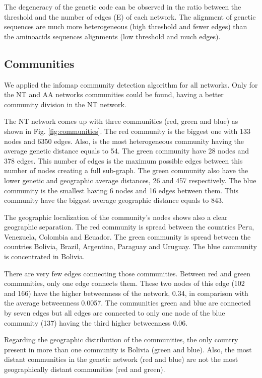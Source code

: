 \documentclass[10pt,letterpaper]{article}
\begin{document}
The degeneracy of the genetic code can be observed in the ratio between the threshold and the number of edges (E) of each network. The alignment of genetic sequences are much more heterogeneous (high threshold and fewer edges) than the aminoacids sequences alignments (low threshold and much edges). 


\subsection*{Communities} We applied the infomap community detection algorithm for all networks. Only for the NT and AA networks communities could be found, having a better community division in the NT network.

The NT network comes up with three communities (red, green and blue) as shown in Fig. \ref{fig:communities}. The red community is the biggest one with 133 nodes and 6350 edges. Also, is the most heterogeneous community having the average genetic distance equals to 54. The green community have 28 nodes and 378 edges. This number of edges is the maximum possible edges between this number of nodes creating a full sub-graph. The green community also have the lower genetic and geographic average distances, 26 and 457 respectively. The blue community is the smallest having 6 nodes and 16 edges between them. This community have the biggest average geographic distance equals to 843.

The geographic localization of the community's nodes shows also a clear geographic separation. The red community is spread between the countries Peru, Venezuela, Colombia and Ecuador. The green community is spread between the countries Bolivia, Brazil, Argentina, Paraguay and Uruguay. The blue community is concentrated in Bolivia.

There are very few edges connecting those communities. Between red and green communities, only one edge connects them. These two nodes of this edge (102 and 166) have the higher betweenness of the network, 0.34, in comparison with the average betweenness 0.0057. The communities green and blue are connected by seven edges but all edges are connected to only one node of the blue community (137) having the third higher betweenness 0.06.

Regarding the geographic distribution of the communities, the only country present in more than one community is Bolivia (green and blue). Also, the most distant communities in the genetic network (red and blue) are not the most geographically distant communities (red and green).
\end{document}
